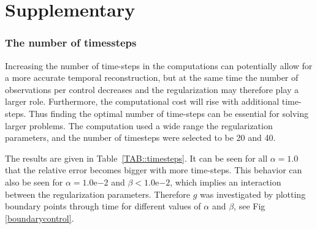 \documentclass[12pt,a4paper]{article}
\begin{document}
\clearpage
\section{Supplementary}

\subsubsection{The number of timessteps}
Increasing the number of time-steps in the computations can potentially allow for a more accurate temporal reconstruction, but at the same time the number of observations per control decreases and the regularization may therefore play a larger role. Furthermore, the computational cost will rise with additional time-steps. Thus finding the optimal number of time-steps can be essential for solving larger problems. The computation used a wide range the regularization parameters, and the number of timesteps were selected to be 20 and 40.

The results are given in Table~\ref{TAB::timesteps}. It can be seen for all $\alpha=1.0$ that the relative error becomes bigger with more time-steps. This behavior can also be seen for $\alpha=1.0\mathrm{e}{-2}$ and $\beta < 1.0\mathrm{e}{-2}$, which implies an interaction between the regularization parameters. Therefore $g$ was investigated by plotting boundary points through time for different values of $\alpha$ and $\beta$, see Fig \ref{boundarycontrol}.
\end{document}

